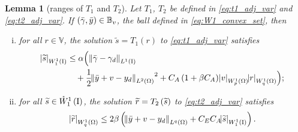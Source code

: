 \documentclass[final]{siamltex}
\newtheorem{lem}[theorem]{Lemma}
\begin{document}
\begin{lem}[ranges of $T_1$ and $T_2$] \label{lem:t_adj_maps_back}
Let $T_1$, $T_2$ be defined in \eqref{eq:t1_adj_var} and \eqref{eq:t2_adj_var}. If
$\del{{\bar{\gamma}},{\bar{y}}} \in {\mathbb{B}}_v$, the ball
defined in \eqref{eq:W1_convex_set}, then
\begin{enumerate}[(i)]
\item\label{item:t_adj_maps_back_i}
	for all $r \in {\mathbb{V}}$, 
        the solution ${\widetilde{s}} = T_1(r)$ to \eqref{eq:t1_adj_var} satisfies
	\begin{align*}
		{\abs{\widetilde{s}}_{{W^{{{1}}}_{{{1}}}\del{{\text{\rm I}}}}}} 
			&\le  \alpha \Big( \norm{{\bar{\gamma}} - \gamma_d}_{{L^1\del{\text{\rm I}}}} \\
                        &\quad + \frac{1}{2}{\norm{{{\bar{y}}+v-y_d}}_{{L^2\del{{\Omega}}}}}^2  
			    +  C_A\del{1+\beta C_A}{\abs{{v}}_{{W^{{1}}_{{p}}\del{{\Omega}}}}}{\abs{{r}}_{{W^{{{1}}}_{{{q}}}\del{{{\Omega}}}}}}  \Big) ;
    \end{align*}   
\item\label{item:t_adj_maps_back_ii} 
	for all ${\widetilde{s}} \in {{\mathring{W}^{{1}}_{{1}}\del{{\text{\rm I}}}}}$, the solution ${\widetilde{r}} = T_2\del{\widetilde{s}}$ to \eqref{eq:t2_adj_var} satisfies
    \[
    	{\abs{\widetilde{r}}_{{W^{{{1}}}_{{{q}}}\del{{{\Omega}}}}}} 
    		\le  2\beta\del{ \norm{{\bar{y}} + v - y_d}_{{L^{q}\del{\Omega}}}
                    + C_E C_A {\abs{\widetilde{s}}_{{W^{{{1}}}_{{{1}}}\del{{\text{\rm I}}}}}}}  .
    \] 
\end{enumerate}
\end{lem}
\end{document}

